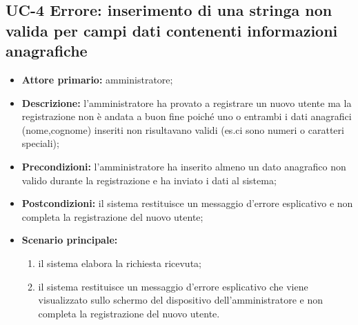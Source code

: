\subsection{UC-4 Errore: inserimento di una stringa non valida per campi dati contenenti informazioni anagrafiche}
\begin{itemize}
	\item \textbf{Attore primario:} amministratore;

	\item \textbf{Descrizione:} l'amministratore ha provato a registrare un nuovo utente ma la registrazione non è andata a buon fine poiché uno o entrambi i dati anagrafici (nome,cognome) inseriti non risultavano validi (es.ci sono numeri o caratteri speciali);

	\item \textbf{Precondizioni:} l'amministratore ha inserito almeno un dato anagrafico non valido durante la registrazione e ha inviato i dati al sistema;

	\item \textbf{Postcondizioni:} il sistema restituisce un messaggio d'errore esplicativo e non completa la registrazione del nuovo utente;

	\item \textbf{Scenario principale:}
	      \begin{enumerate}
		      \item il sistema elabora la richiesta ricevuta;
		      \item il sistema restituisce un messaggio d'errore esplicativo che viene visualizzato sullo schermo del dispositivo dell'amministratore e non completa la registrazione del nuovo utente.
	      \end{enumerate}
\end{itemize}



